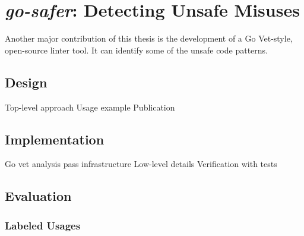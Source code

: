 
\chapter{\textit{go-safer}: Detecting Unsafe Misuses}\label{ch:go-safer}

Another major contribution of this thesis is the development of a Go Vet-style, open-source linter tool.
It can identify some of the unsafe code patterns.





\section{Design}\label{sec:go-safer:design}

Top-level approach
Usage example
Publication





\section{Implementation}\label{sec:go-safer:implementation}

Go vet analysis pass infrastructure
Low-level details
Verification with tests



\section{Evaluation}\label{sec:go-safer:evaluation}



\subsection{Labeled Usages}\label{subsec:go-safer:evaluation:labeled-usages}

